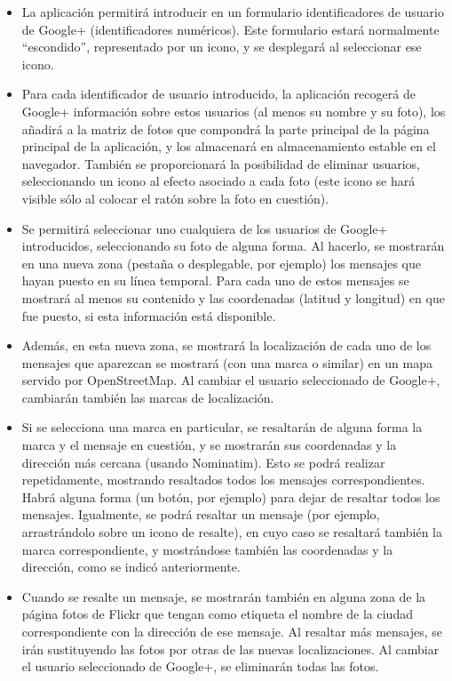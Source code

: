 \begin{itemize}
\item La aplicación permitirá introducir en un formulario identificadores de usuario de Google+ (identificadores numéricos). Este formulario estará normalmente ``escondido'', representado por un icono, y se desplegará al seleccionar ese icono.
\item Para cada identificador de usuario introducido, la aplicación recogerá de Google+ información sobre estos usuarios (al menos su nombre y su foto), los añadirá a la matriz de fotos que compondrá la parte principal de la página principal de la aplicación, y los almacenará en almacenamiento estable en el navegador. También se proporcionará la posibilidad de eliminar usuarios, seleccionando un icono al efecto asociado a cada foto (este icono se hará visible sólo al colocar el ratón sobre la foto en cuestión).

\item Se permitirá seleccionar uno cualquiera de los usuarios de Google+ introducidos, seleccionando su foto de alguna forma. Al hacerlo, se mostrarán en una nueva zona (pestaña o desplegable, por ejemplo) los mensajes que hayan puesto en su línea temporal. Para cada uno de estos mensajes se mostrará al menos su contenido y las coordenadas (latitud y longitud) en que fue puesto, si esta información está disponible.

\item Además, en esta nueva zona, se mostrará la localización de cada uno de los mensajes que aparezcan se mostrará (con una marca o similar) en un mapa servido por OpenStreetMap. Al cambiar el usuario seleccionado de Google+, cambiarán también las marcas de localización.

\item Si se selecciona una marca en particular, se resaltarán de alguna forma la marca y el mensaje en cuestión, y se mostrarán sus coordenadas y la dirección más cercana (usando Nominatim). Esto se podrá realizar repetidamente, mostrando resaltados todos los mensajes correspondientes. Habrá alguna forma (un botón, por ejemplo) para dejar de resaltar todos los mensajes. Igualmente, se podrá resaltar un mensaje (por ejemplo, arrastrándolo sobre un icono de resalte), en cuyo caso se resaltará también la marca correspondiente, y mostrándose también las coordenadas y la dirección, como se indicó anteriormente.

\item Cuando se resalte un mensaje, se mostrarán también en alguna zona de la página fotos de Flickr que tengan como etiqueta el nombre de la ciudad correspondiente con la dirección de ese mensaje. Al resaltar más mensajes, se irán sustituyendo las fotos por otras de las nuevas localizaciones. Al cambiar el usuario seleccionado de Google+, se eliminarán todas las fotos.
\end{itemize}

